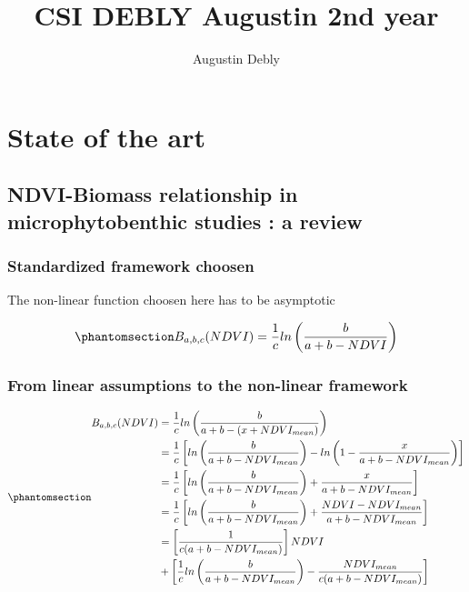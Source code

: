 \documentclass[
  letterpaper,
  DIV=11,
  numbers=noendperiod]{scrartcl}
\title{CSI DEBLY Augustin 2nd year}
\author{Augustin Debly}
\date{}
\begin{document}
\maketitle

\section{State of the art}\label{state-of-the-art}

\subsection{NDVI-Biomass relationship in microphytobenthic studies : a
review}\label{ndvi-biomass-relationship-in-microphytobenthic-studies-a-review}

\subsubsection{Standardized framework
choosen}\label{standardized-framework-choosen}

The non-linear function choosen here has to be asymptotic

\begin{equation}\phantomsection\label{eq-NDVIB}{
B_{a,b,c}(NDVI) = \frac{1}{c}ln\left(\frac{b}{a+b-NDVI}\right)
}\end{equation}

\subsubsection{From linear assumptions to the non-linear
framework}\label{from-linear-assumptions-to-the-non-linear-framework}

\begin{equation}\phantomsection\label{eq-linearNDVIB}{
\begin{aligned}
    B_{a,b,c}(NDVI) &= \frac{1}{c}ln\left(\frac{b}{a+b-(x+NDVI_{mean})}\right)\\
    &= \frac{1}{c}\left[ln\left(\frac{b}{a+b-NDVI_{mean}}\right)-ln\left(1-\frac{x}{a+b-NDVI_{mean}}\right)\right]\\
    &= \frac{1}{c}\left[ln\left(\frac{b}{a+b-NDVI_{mean}}\right)+\frac{x}{a+b-NDVI_{mean}}\right]\\
    &= \frac{1}{c}\left[ln\left(\frac{b}{a+b-NDVI_{mean}}\right)+\frac{NDVI - NDVI_{mean}}{a+b-NDVI_{mean}}\right]\\
    &= \left[\frac{1}{c(a+b-NDVI_{mean})}\right]NDVI\\&+\left[\frac{1}{c}ln\left(\frac{b}{a+b-NDVI_{mean}}\right)-\frac{NDVI_{mean}}{c(a+b-NDVI_{mean})}\right]\\
\end{aligned}
}\end{equation}
\end{document}
